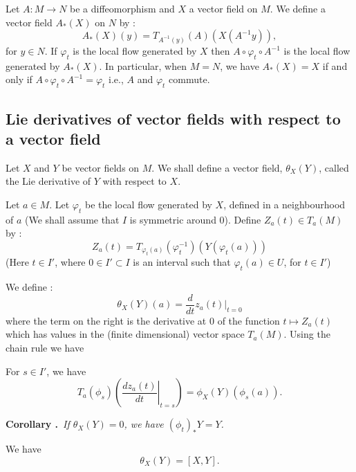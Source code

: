 \begin{remark}\label{sec6-rem6.3}
Let $A:M\to N$ be a diffeomorphism and $X$ a vector field on $M$. We define a vector field $A_{*}(X)$ on $N$ by : 
$$
A_{*}(X)(y)=T_{A^{-1}(y)}(A)(X(A^{-1}y)),
$$
for $y\in N$. If $\varphi_{t}$ is the local flow generated by $X$ then $A\circ \varphi_{t}\circ A^{-1}$ is the local flow generated by $A_{*}(X)$. In particular, when $M=N$, we have $A_{*}(X)=X$ if and only if $A\circ \varphi_{t}\circ A^{-1}=\varphi_{t}$ i.e., $A$ and $\varphi_{t}$ commute. 
\end{remark}

\subsection*{Lie derivatives of vector fields with respect to a vector field}

Let $X$ and $Y$ be vector fields on $M$. We shall define a vector field, $\theta_{X}(Y)$, called the Lie derivative of $Y$ with respect to $X$.

Let $a\in M$. Let $\varphi_{t}$ be the local flow generated by $X$, defined in a neighbourhood of $a$ (We shall assume that $I$ is symmetric around $0$). Define $Z_{a}(t)\in T_{a}(M)$ by :
$$
Z_{a}(t)=T_{\varphi_{t}(a)}(\varphi^{-1}_{t})(Y(\varphi_{t}(a)))
$$
(Here $t\in I'$, where $0\in I'\subset I$ is an interval such that $\varphi_{t}(a)\in U$, for $t\in I'$)

We define :
$$
\theta_{X}(Y)(a)=\dfrac{d}{dt}z_{a}(t)\big|_{t=0}
$$
where the term on the right is the derivative at $0$ of the function $t\mapsto Z_{a}(t)$\pageoriginale which has values in the (finite dimensional) vector space $T_{a}(M)$. Using the chain rule we have

\begin{lemma}\label{sec6-lem6.4}
For $s\in I'$, we have
$$
T_{a}(\phi_{s})\left(\left.\dfrac{dz_{a}(t)}{dt}\right|_{t=s}\right)=\phi_{X}(Y)(\phi_{s}(a)).
$$
\end{lemma}

\noindent
{\bf Corollary .\label{sec6-coro6.4.1}}~{\em If $\theta_{X}(Y)=0$, we have $(\phi_{t})_{*}Y=Y$.}

\begin{theorem}\label{sec6-thm6.5}
We have
$$
\theta_{X}(Y)=[X,Y].
$$
\end{theorem}

